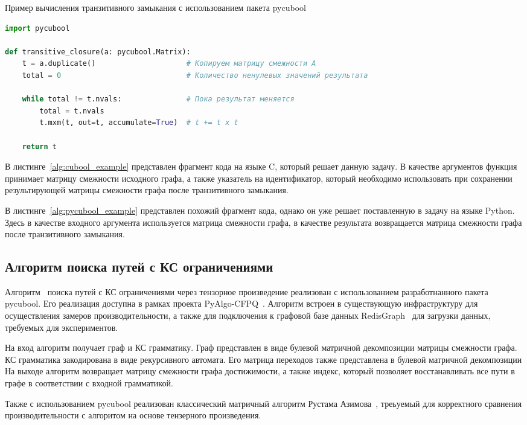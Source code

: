 \begin{algorithm}[t]
\caption{Пример вычисления транзитивного замыкания с использованием пакета pycubool}
\label{alg:pycubool_example}
\begin{lstlisting}[language=Python]
import pycubool

def transitive_closure(a: pycubool.Matrix):
    t = a.duplicate()                     # Копируем матрицу смежности А
    total = 0                             # Количество ненулевых значений результата

    while total != t.nvals:               # Пока результат меняется
        total = t.nvals
        t.mxm(t, out=t, accumulate=True)  # t += t x t

    return t
\end{lstlisting}
\end{algorithm}

В листинге~\ref{alg:cubool_example} представлен фрагмент кода на языке C, который решает данную задачу. В качестве аргументов функция принимает матрицу смежности исходного графа, а также указатель на идентификатор, который необходимо использовать при сохранении результирующей матрицы смежности графа после транзитивного замыкания.

В листинге~\ref{alg:pycubool_example} представлен похожий фрагмент кода, однако он уже решает поставленную в задачу на языке Python. Здесь в качестве входного аргумента используется матрица смежности графа, в качестве результата возвращается матрица смежности графа после транзитивного замыкания.

\subsection{Алгоритм поиска путей с КС ограничениями}

Алгоритм~\cite{inbook:kronecker_cfpq_adbis} поиска путей с КС ограничениями через тензорное произведение реализован с использованием разработнанного пакета pycubool. 
Его реализация доступна в рамках проекта PyAlgo-CFPQ~\cite{net:cfpq_py_algo}.
Алгоритм встроен в существующую инфраструктуру для осуществления замеров производительности, а также для подключения
к графовой базе данных RedisGraph~\cite{paper:redisgraph} для загрузки данных, требуемых для экспериментов.

На вход алгоритм получает граф и КС грамматику. 
Граф представлен в виде булевой матричной декомпозиции матрицы смежности графа.
КС грамматика закодирована в виде рекурсивного автомата. 
Его матрица переходов также представлена в булевой матричной декомпозиции
На выходе алгоритм возвращает матрицу смежности графа достижимости, а также индекс, 
который позволяет восстанавливать все пути в графе в соответствии с входной грамматикой.

Также с использованием pycubool реализован классический матричный алгоритм Рустама Азимова~\cite{inproceedings:matrix_cfpq}, треьуемый для корректного сравнения производительности с алгоритом на основе тензерного произведения.